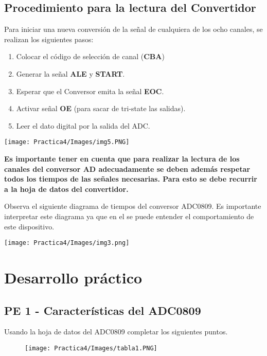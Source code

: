 \documentclass[12pt]{article}
\begin{document}
    \subsection{Procedimiento para la lectura del Convertidor}
    \begin{multicols}{2}
			Para iniciar una nueva conversión de la señal de cualquiera de los ocho canales, se realizan los siguientes pasos:
    
    \begin{enumerate}
        \item Colocar el código de selección de canal (\textbf{CBA})
        \item Generar la señal \textbf{ALE} y \textbf{START}.
        \item Esperar que el Conversor emita la señal \textbf{EOC}.
        \item Activar señal \textbf{OE} (para sacar de tri-state las salidas).
        \item Leer el dato digital por la salida del ADC.
        
    \end{enumerate}

	\columnbreak

	\texttt{[image: Practica4/Images/img5.PNG]}
    \end{multicols}

    \textbf{Es importante tener en cuenta que para realizar la lectura de los canales del conversor AD adecuadamente se deben además respetar todos los tiempos de las señales necesarias. Para esto se debe recurrir a la hoja de datos del convertidor.}
    
    Observa el siguiente diagrama de tiempos del conversor ADC0809. Es importante interpretar este diagrama ya que en el se puede entender el comportamiento de este dispositivo.
    
    \texttt{[image: Practica4/Images/img3.png]}
    



    \newpage
	\section{Desarrollo práctico}
	\subsection{PE 1 - Características del ADC0809}
	Usando la hoja de datos del ADC0809 completar los siguientes puntos.
    \begin{figure}[h!]
                \centering
                \texttt{[image: Practica4/Images/tabla1.PNG]}
    \end{figure}
    
\end{document}
